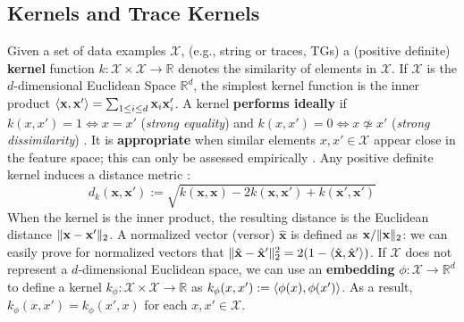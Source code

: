 {\subsection{Kernels and Trace Kernels}\label{subsec:katk}
Given a set of data examples $\mathcal{X}$, (e.g., string or traces, TGs) a (positive definite) \textbf{kernel} function 
$k\colon \mathcal{X}\times \mathcal{X}\to \mathbb{R}$ denotes the similarity of elements in $\mathcal{X}$. If $\mathcal{X}$ is the $d$-dimensional Euclidean Space $\mathbb{R}^d$, the simplest kernel function is the inner product 
$\Braket{\mathbf{x},\mathbf{x}'}=\sum_{1\leq i\leq d}\mathbf{x}_i\mathbf{x}'_i$. 
A kernel \textbf{performs ideally} if $k(x,x')=1\Leftrightarrow x=x'$ (\textit{strong equality}) and 
$k(x,x')=0\Leftrightarrow x\not\simeq x'$ (\textit{strong dissimilarity}) \cite{Gartner03}. It is \textbf{appropriate} when similar 
elements $x,x'\in\mathcal{X}$ appear close in the feature space; this can only be assessed  empirically \cite{Gartner03}.
Any positive definite kernel induces a distance metric \cite{Raedt}:
\begin{equation}\label{eq:dofk}
d_k(\mathbf{x},\mathbf{x}'):=\sqrt{k(\mathbf{x},\mathbf{x})-2k(\mathbf{x},\mathbf{x}')+k(\mathbf{x}',\mathbf{x}')}
\end{equation}
When the kernel is the inner product, the resulting distance is the Euclidean distance $\|\mathbf{x}-\mathbf{x}'\|_{2}$. 
A normalized vector (versor) $\hat{\mathbf{x}}$ is defined as $\mathbf{x}/\|\mathbf{x}\|_{2}$: we can easily prove for normalized vectors that $\|\hat{\mathbf{x}}-\hat{\mathbf{x}}'\|_{2}^2=2(1-\Braket{\hat{\mathbf{x}},\hat{\mathbf{x}}'})$.
%
If $\mathcal{X}$ does not represent a $d$-dimensional Euclidean space, we can use an \textbf{embedding} 
$\phi\colon\mathcal{X}\to \mathbb{R}^d$ to define a kernel $k_\phi\colon \mathcal{X}\times \mathcal{X}\to\mathbb{R}$ as $k_\phi(x,x'):=\Braket{\phi(x),\phi(x')}$. As a result, $k_\phi(x,x')=k_\phi(x',x)$ for each $x,x'\in\mathcal{X}$.

}
